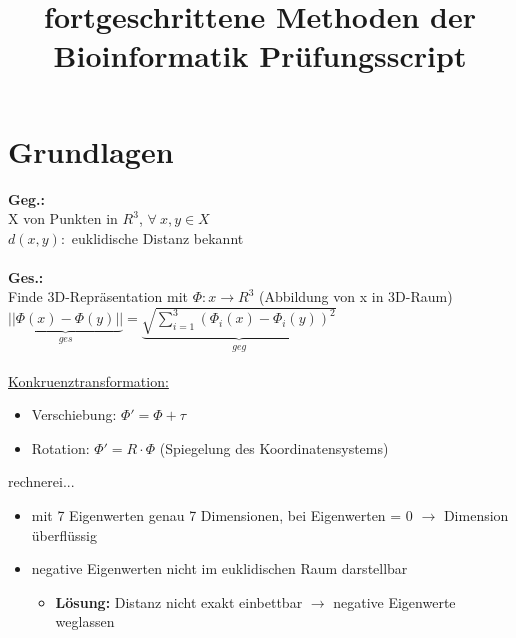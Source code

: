 \documentclass[12pt,a4paper]{article}
\title{\Huge\textbf{fortgeschrittene Methoden der Bioinformatik Prüfungsscript}}
\author{}
\date{}
\begin{document}
\begin{titlepage}

\maketitle
\thispagestyle{empty}
\end{titlepage}
\newpage

\begin{titlepage}
\tableofcontents
\thispagestyle{empty}
\end{titlepage}

\section{Grundlagen}
\textbf{Geg.:}\\
X von Punkten in $R^3$, $\forall\ x,y \in X$\\
$d(x,y):$ euklidische Distanz bekannt
\\\\
\textbf{Ges.:}\\
Finde 3D-Repräsentation mit $\Phi: x \rightarrow R^3$ (Abbildung von x in 3D-Raum)\\
$\underbrace{||\Phi(x)-\Phi(y)||}_{ges} = \underbrace{\sqrt{\sum \limits_{i=1}^{3} (\Phi_{i}(x)-\Phi_{i}(y))^2}}_{geg}$\\
\\
\underline{Konkruenztransformation:}
\begin{itemize}
	\item Verschiebung: $\Phi'=\Phi+\tau$
	\item Rotation: $\Phi'=R\cdot\Phi$ (Spiegelung des Koordinatensystems)
\end{itemize}

rechnerei...

\begin{itemize}
	\item mit 7 Eigenwerten genau 7 Dimensionen, bei Eigenwerten = 0 $\rightarrow$ Dimension überflüssig
	\item negative Eigenwerten nicht im euklidischen Raum darstellbar
	\begin{itemize}
		\item \textbf{Lösung:} Distanz nicht exakt einbettbar $\rightarrow$ negative Eigenwerte weglassen
	\end{itemize}
\end{itemize}
\end{document}
